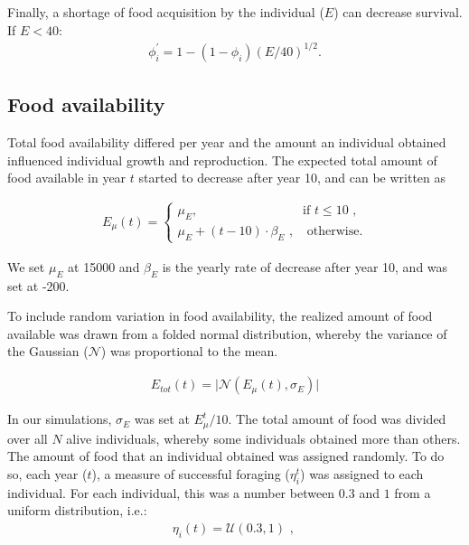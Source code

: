 
Finally, a shortage of food acquisition by the individual ($E$) can decrease survival. If $E<40$:
\begin{align}
	\phi_i^{\prime}= 1 - (1-\phi_{i})(E/40)^{1/2}\text{.}
\end{align}

\subsection{Food availability} \label{app:simul:food}
Total food availability differed per year and the amount an individual obtained influenced individual growth and reproduction. The expected total amount of food available in year $t$ started to decrease after year 10, and can be written as

\begin{align}
   E_{\mu} (t) = 
\begin{cases}
    \mu_E, & \text{if } t \leq 10 \text{ ,}\\
    \mu_E + (t-10) \cdot \beta_E \text{ ,}             & \text{ otherwise.}
\end{cases}
\end{align}

We set $\mu_E$ at 15000 and $\beta_E$ is the yearly rate of decrease after year 10, and was set at -200.

To include random variation in food availability, the realized amount of food available was drawn from a folded normal distribution, whereby the variance of the Gaussian ($\mathcal{N}$) was proportional to the mean.

\begin{align}
E_{tot} (t) = \lvert \mathcal{N}(E_{\mu}(t),\sigma_E)\rvert
\end{align}

In our simulations, $\sigma_E$ was set at $E^t_{\mu}/10$. The total amount of food was divided over all $N$ alive individuals, whereby some individuals obtained more than others. The amount of food that an individual obtained was assigned randomly. To do so, each year ($t$), a measure of successful foraging ($\eta_i^t$) was assigned to each individual. For each individual, this was a number between $0.3$ and $1$ from a uniform distribution, i.e.:
\begin{align}
\eta_i (t) = \mathcal{U}(0.3,1) \text{ , }
\end{align}

